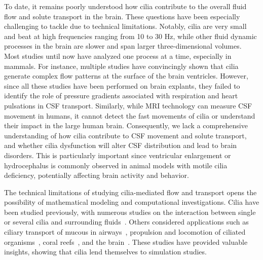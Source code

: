 \documentclass[fleqn]{wlscirep}
\begin{document}
To date, it remains poorly understood how cilia contribute to the overall fluid
flow and solute transport in the brain.
These questions have been especially challenging to tackle due to technical limitations.
Notably, cilia are very small and beat at high frequencies ranging from 10 to 30 Hz,
while other fluid dynamic processes in the brain are slower and span larger three-dimensional volumes.
Most studies until now have analyzed one process at a time, especially in mammals.
For instance, multiple studies have convincingly shown that cilia generate complex
flow patterns at the surface of the brain ventricles.
However, since all these studies have been performed on brain explants, they failed
to identify the role of pressure gradients associated with respiration and heart pulsations in CSF transport.
Similarly, while MRI technology can measure CSF movement in humans, it cannot detect
the fast movements of cilia or understand their impact in the large human brain.
Consequently, we lack a comprehensive understanding of how cilia contribute to CSF
movement and solute transport, and whether cilia dysfunction will alter CSF distribution
and lead to brain disorders.
This is particularly important since ventricular enlargement or hydrocephalus is
commonly observed in animal models with motile cilia deficiency, potentially affecting
brain activity and behavior.

The technical limitations of studying cilia-mediated flow and transport opens the
possibility of mathematical modeling and computational investigations. Cilia have been studied previously,
with numerous studies on the interaction between single or several cilia and surrounding
fluids~\cite{Guo2020SimulatingGeometries, Ruvalcaba2021NumericalTree, Smith2009MathematicalFluids,
Cui2019NumericalMethod, Cui2022AFlow}.
Others considered applications such as ciliary transport of mucous in
airways~\cite{Fulford1986Muco-ciliaryLung, Ramirez-SanJuan2020Multi-scaleArrays},
propulsion and locomotion of ciliated organisms~\cite{BLAKE1974MechanicsMotion,
Jahn1972LocomotionProtozoa, Brennen1977FluidFlagella},
coral reefs~\cite{Pacherres2022CiliaryProduction}, and the brain~\cite{Siyahhan2014FlowVentricles,
Yoshida2022EffectVentricles, Salman2022ComputationalEmbryo, Thouvenin2020OriginCanal}.
These studies have provided valuable insights, showing that cilia lend themselves to simulation studies.
\end{document}
